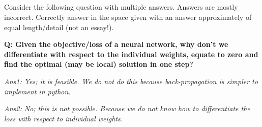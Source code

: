 \begin{frame}
\section{}
Consider the following question with multiple answers. Answers are mostly incorrect. Correctly answer in the space given with an answer approximately of equal length/detail (not an essay!).

{\bf Q: Given the objective/loss of a neural network, why don't we differentiate with respect to the individual weights, equate to zero and find the optimal (may be local) solution in one step?}

{\em Ans1: Yes; it is feasible. We do not do this because back-propagation is simpler to implement in python.}

{\em Ans2: No; this is not possible. Because we do not know how to differentiate the loss with respect to individual weights.}


\end{frame}
